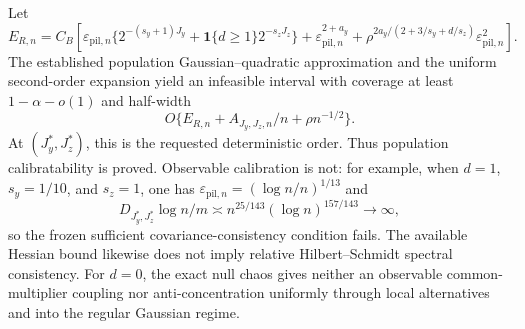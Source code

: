 Let
\[
E_{R,n}=C_B\left[
\varepsilon_{\mathrm{pil},n}\{2^{-(s_y+1)J_y}+\mathbf1\{d\ge1\}2^{-s_zJ_z}\}
+\varepsilon_{\mathrm{pil},n}^{2+a_y}
+\rho^{2a_y/(2+3/s_y+d/s_z)}\varepsilon_{\mathrm{pil},n}^2
\right].
\]
The established population Gaussian--quadratic approximation and the uniform second-order expansion yield an infeasible interval with coverage at least \(1-\alpha-o(1)\) and half-width
\[
O\{E_{R,n}+A_{J_y,J_z,n}/n+\rho n^{-1/2}\}.
\]
At \((J_y^*,J_z^*)\), this is the requested deterministic order. Thus population calibratability is proved. Observable calibration is not: for example, when \(d=1\), \(s_y=1/10\), and \(s_z=1\), one has \(\varepsilon_{\mathrm{pil},n}=(\log n/n)^{1/13}\) and
\[
D_{J_y^*,J_z^*}\log n/m
\asymp n^{25/143}(\log n)^{157/143}\to\infty,
\]
so the frozen sufficient covariance-consistency condition fails. The available Hessian bound likewise does not imply relative Hilbert--Schmidt spectral consistency. For \(d=0\), the exact null chaos gives neither an observable common-multiplier coupling nor anti-concentration uniformly through local alternatives and into the regular Gaussian regime.